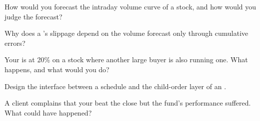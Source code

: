 \begin{interviewq}\label{iq:mx:benchmark-algorithms:2}
How would you forecast the intraday volume curve of a stock, and how would you judge the forecast?
\end{interviewq}

\begin{interviewq}\label{iq:mx:benchmark-algorithms:3}
Why does a 's slippage depend on the volume forecast only through cumulative errors?
\end{interviewq}

\begin{interviewq}\label{iq:mx:benchmark-algorithms:4}
Your  is at 20\% on a stock where another large buyer is also running one. What happens, and what would you do?
\end{interviewq}

\begin{interviewq}\label{iq:mx:benchmark-algorithms:5}
Design the interface between a schedule and the child-order layer of an .
\end{interviewq}

\begin{interviewq}\label{iq:mx:benchmark-algorithms:6}
A client complains that your  beat the close but the fund's performance suffered. What could have happened?
\end{interviewq}
